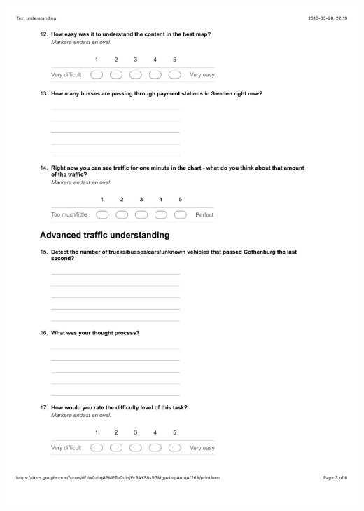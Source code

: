 \documentclass[12pt]{kththesis}
\begin{document}
\begin{appendices}
\includegraphics[width=1\textwidth]{TextUnderstanding3.pdf}

\end{appendices}
\end{document}
